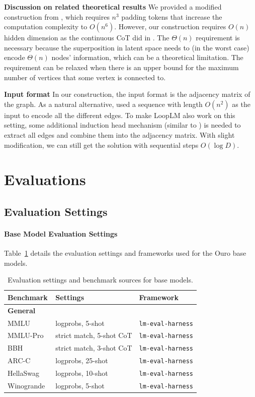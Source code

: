 \documentclass[]{bytedance_seed}
\newcommand{\1}{\mathbf{1}}
\newcommand{\ut}{LoopLM}
\begin{document}
{\textbf{Discussion on related theoretical results} We provided a modified construction from \cite{merrill2025little}, which requires $n^3$ padding tokens that increase the computation complexity to $O(n^6)$. However, our construction requires $O(n)$ hidden dimension as the continuous CoT did in \cite{zhu2025reasoning}. The $\Theta(n)$ requirement is necessary because the superposition in latent space needs to (in the worst case) encode $\Theta(n)$ nodes' information, which can be a theoretical limitation. The requirement can be relaxed when there is an upper bound for the maximum number of vertices that some vertex is connected to. 

\textbf{Input format} In our construction, the input format is the adjacency matrix of the graph. As a natural alternative, \cite{zhu2025reasoning} used a sequence with length $O(n^2)$ as the input to encode all the different edges. To make \ut{} also work on this setting, some additional induction head mechanism (similar to \cite{zhu2025reasoning}) is needed to extract all edges and combine them into the adjacency matrix. With slight modification, we can still get the solution with sequential steps $O(\log D)$. 

\section{Evaluations}
\subsection{Evaluation Settings}
\label{sec:appendix_eval}
\paragraph{Base Model Evaluation Settings}
Table~\ref{tab:eval_base_settings} details the evaluation settings and frameworks used for the Ouro base models.

\begin{table}[htbp]
\centering
\caption{Evaluation settings and benchmark sources for base models.}
\label{tab:eval_base_settings}
\footnotesize
\begin{tabular}{lll}
\toprule
\textbf{Benchmark} & \textbf{Settings} & \textbf{Framework}\\
\midrule
\multicolumn{3}{l}{\textbf{General}} \\
\quad MMLU~\citep{hendrycks2020measuring} & logprobs, 5-shot & \texttt{lm-eval-harness}\\
\quad MMLU-Pro~\citep{wang2024mmlu} & strict match, 5-shot CoT & \texttt{lm-eval-harness}  \\
\quad BBH~\citep{suzgun2022challenging} & strict match, 3-shot CoT & \texttt{lm-eval-harness}\\
\quad ARC-C~\citep{clark2018think} & logprobs, 25-shot & \texttt{lm-eval-harness} \\
\quad HellaSwag~\citep{zellers2019hellaswag} & logprobs, 10-shot & \texttt{lm-eval-harness}\\
\quad Winogrande~\citep{sakaguchi2021winogrande} & logprobs, 5-shot & \texttt{lm-eval-harness}\\


\end{tabular}
\end{table}}
\end{document}
